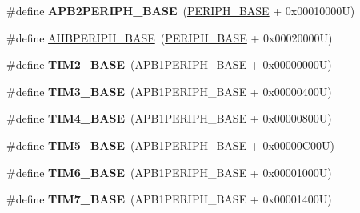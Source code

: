 \begin{DoxyCompactItemize}
\item 
\hypertarget{group___peripheral__memory__map_ga25b99d6065f1c8f751e78f43ade652cb}{\#define {\bfseries A\-P\-B2\-P\-E\-R\-I\-P\-H\-\_\-\-B\-A\-S\-E}~(\hyperlink{group___peripheral__memory__map_ga9171f49478fa86d932f89e78e73b88b0}{P\-E\-R\-I\-P\-H\-\_\-\-B\-A\-S\-E} + 0x00010000\-U)}\label{group___peripheral__memory__map_ga25b99d6065f1c8f751e78f43ade652cb}

\item 
\#define \hyperlink{group___peripheral__memory__map_ga92eb5d49730765d2abd0f5b09548f9f5}{A\-H\-B\-P\-E\-R\-I\-P\-H\-\_\-\-B\-A\-S\-E}~(\hyperlink{group___peripheral__memory__map_ga9171f49478fa86d932f89e78e73b88b0}{P\-E\-R\-I\-P\-H\-\_\-\-B\-A\-S\-E} + 0x00020000\-U)
\item 
\hypertarget{group___peripheral__memory__map_ga00d0fe6ad532ab32f0f81cafca8d3aa5}{\#define {\bfseries T\-I\-M2\-\_\-\-B\-A\-S\-E}~(A\-P\-B1\-P\-E\-R\-I\-P\-H\-\_\-\-B\-A\-S\-E + 0x00000000\-U)}\label{group___peripheral__memory__map_ga00d0fe6ad532ab32f0f81cafca8d3aa5}

\item 
\hypertarget{group___peripheral__memory__map_gaf0c34a518f87e1e505cd2332e989564a}{\#define {\bfseries T\-I\-M3\-\_\-\-B\-A\-S\-E}~(A\-P\-B1\-P\-E\-R\-I\-P\-H\-\_\-\-B\-A\-S\-E + 0x00000400\-U)}\label{group___peripheral__memory__map_gaf0c34a518f87e1e505cd2332e989564a}

\item 
\hypertarget{group___peripheral__memory__map_ga56e2d44b0002f316527b8913866a370d}{\#define {\bfseries T\-I\-M4\-\_\-\-B\-A\-S\-E}~(A\-P\-B1\-P\-E\-R\-I\-P\-H\-\_\-\-B\-A\-S\-E + 0x00000800\-U)}\label{group___peripheral__memory__map_ga56e2d44b0002f316527b8913866a370d}

\item 
\hypertarget{group___peripheral__memory__map_ga3e1671477190d065ba7c944558336d7e}{\#define {\bfseries T\-I\-M5\-\_\-\-B\-A\-S\-E}~(A\-P\-B1\-P\-E\-R\-I\-P\-H\-\_\-\-B\-A\-S\-E + 0x00000\-C00\-U)}\label{group___peripheral__memory__map_ga3e1671477190d065ba7c944558336d7e}

\item 
\hypertarget{group___peripheral__memory__map_ga8268ec947929f192559f28c6bf7d1eac}{\#define {\bfseries T\-I\-M6\-\_\-\-B\-A\-S\-E}~(A\-P\-B1\-P\-E\-R\-I\-P\-H\-\_\-\-B\-A\-S\-E + 0x00001000\-U)}\label{group___peripheral__memory__map_ga8268ec947929f192559f28c6bf7d1eac}

\item 
\hypertarget{group___peripheral__memory__map_ga0ebf54364c6a2be6eb19ded6b18b6387}{\#define {\bfseries T\-I\-M7\-\_\-\-B\-A\-S\-E}~(A\-P\-B1\-P\-E\-R\-I\-P\-H\-\_\-\-B\-A\-S\-E + 0x00001400\-U)}\label{group___peripheral__memory__map_ga0ebf54364c6a2be6eb19ded6b18b6387}


\end{DoxyCompactItemize}
